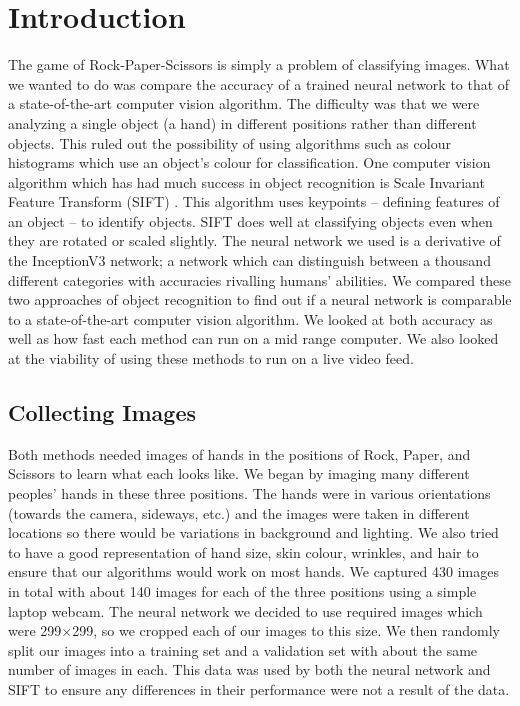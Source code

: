 \section{Introduction}

The game of Rock-Paper-Scissors is simply a problem of classifying images. What we wanted to do was compare the accuracy of a trained neural network to that of a state-of-the-art computer vision algorithm. The difficulty was that we were analyzing a single object (a hand) in different positions rather than different objects. This ruled out the possibility of using algorithms such as colour histograms which use an object's colour for classification. One computer vision algorithm which has had much success in object recognition is Scale Invariant Feature Transform (SIFT) \cite{SIFT}. This algorithm uses keypoints -- defining features of an object -- to identify objects. SIFT does well at classifying objects even when they are rotated or scaled slightly. The neural network we used is a derivative of the InceptionV3 network; a network which can distinguish between a thousand different categories with accuracies rivalling humans' abilities. We compared these two approaches of object recognition to find out if a neural network is comparable to a state-of-the-art computer vision algorithm. We looked at both accuracy as well as how fast each method can run on a mid range computer. We also looked at the viability of using these methods to run on a live video feed.

\subsection{Collecting Images}
Both methods needed images of hands in the positions of Rock, Paper, and Scissors to learn what each looks like. We began by imaging many different peoples' hands in these three positions. The hands were in various orientations (towards the camera, sideways, etc.) and the images were taken in different locations so there would be variations in background and lighting.  We also tried to have a good representation of hand size, skin colour, wrinkles, and hair to ensure that our algorithms would work on most hands. We captured 430 images in total with about 140 images for each of the three positions using a simple laptop webcam. The neural network we decided to use required images which were 299$\times$299, so we cropped each of our images to this size. We then randomly split our images into a training set and a validation set with about the same number of images in each. This data was used by both the neural network and SIFT to ensure any differences in their performance were not a result of the data.

